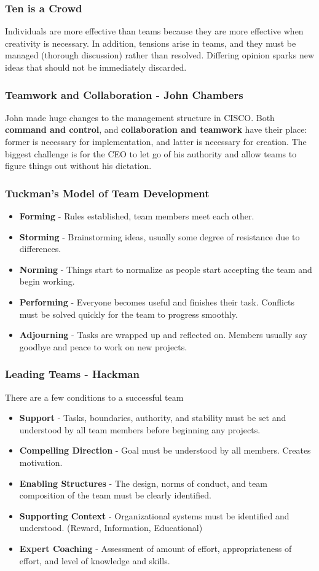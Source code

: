 \documentclass[english, 12pt]{article}
\begin{document}
\subsubsection*{Ten is a Crowd}
Individuals are more effective than teams because they are more effective when creativity is necessary. In addition, tensions arise in teams, and they must be managed (thorough discussion) rather than resolved. Differing opinion sparks new ideas that should not be immediately discarded.
\subsubsection*{Teamwork and Collaboration - John Chambers}
John made huge changes to the management structure in CISCO. Both \textbf{command and control}, and \textbf{collaboration and teamwork} have their place: former is necessary for implementation, and latter is necessary for creation. The biggest challenge is for the CEO to let go of his authority and allow teams to figure things out without his dictation.
\subsubsection*{Tuckman's Model of Team Development}
\begin{itemize}
\item \textbf{Forming} - Rules established, team members meet each other.
\item \textbf{Storming} - Brainstorming ideas, usually some degree of resistance due to differences.
\item \textbf{Norming} - Things start to normalize as people start accepting the team and begin working.
\item \textbf{Performing} - Everyone becomes useful and finishes their task. Conflicts must be solved quickly for the team to progress smoothly.
\item \textbf{Adjourning} - Tasks are wrapped up and reflected on. Members usually say goodbye and peace to work on new projects.
\end{itemize}
\subsubsection*{Leading Teams - Hackman}
There are a few conditions to a successful team
\begin{itemize}
\item \textbf{Support} - Tasks, boundaries, authority, and stability must be set and understood by all team members before beginning any projects.
\item \textbf{Compelling Direction} - Goal must be understood by all members. Creates motivation.
\item \textbf{Enabling Structures} - The design, norms of conduct, and team composition of the team must be clearly identified.
\item \textbf{Supporting Context} - Organizational systems must be identified and understood. (Reward, Information, Educational)
\item \textbf{Expert Coaching} - Assessment of amount of effort, appropriateness of effort, and level of knowledge and skills.
\end{itemize}
\end{document}
